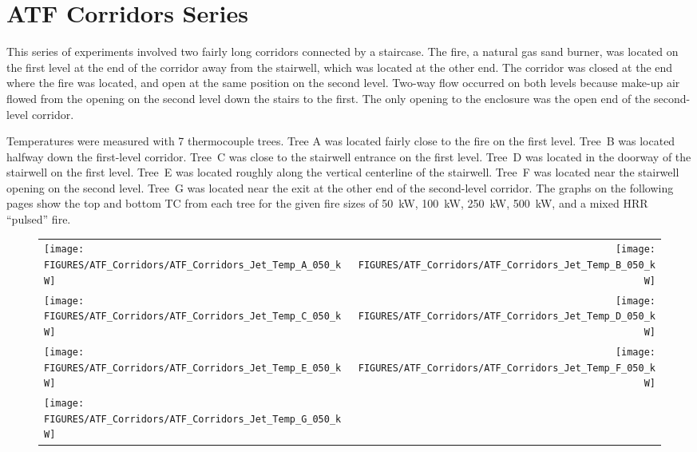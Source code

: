 \clearpage

\section{ATF Corridors Series}

This series of experiments involved two fairly long corridors connected by a staircase. The fire, a natural gas sand
burner, was located on the first level at the end of the corridor away from the stairwell, which was located at the
other end. The corridor was closed at the end where the fire was located, and open at the same position on the
second level. Two-way flow occurred on both levels because make-up air flowed from the opening on the second level down
the stairs to the first. The only opening to the enclosure was the open end of the second-level corridor.

Temperatures were measured with 7 thermocouple trees. Tree A was located fairly close to the fire on the first level. Tree~B
was located halfway down the first-level corridor. Tree~C was close to the stairwell entrance on the first level. Tree~D was located
in the doorway of the stairwell on the first level. Tree~E was located roughly along the vertical centerline of the
stairwell. Tree~F was located near the stairwell opening on the second level. Tree~G was located near the exit at the
other end of the second-level corridor. The graphs on the following pages show the top and bottom TC from each tree for
the given fire sizes of 50~kW, 100~kW, 250~kW, 500~kW, and a mixed HRR ``pulsed'' fire.

\begin{figure}[p]
\begin{tabular*}{\textwidth}{l@{\extracolsep{\fill}}r}
\texttt{[image: FIGURES/ATF\_Corridors/ATF\_Corridors\_Jet\_Temp\_A\_050\_kW]} &
\texttt{[image: FIGURES/ATF\_Corridors/ATF\_Corridors\_Jet\_Temp\_B\_050\_kW]} \\
\texttt{[image: FIGURES/ATF\_Corridors/ATF\_Corridors\_Jet\_Temp\_C\_050\_kW]} &
\texttt{[image: FIGURES/ATF\_Corridors/ATF\_Corridors\_Jet\_Temp\_D\_050\_kW]} \\
\texttt{[image: FIGURES/ATF\_Corridors/ATF\_Corridors\_Jet\_Temp\_E\_050\_kW]} &
\texttt{[image: FIGURES/ATF\_Corridors/ATF\_Corridors\_Jet\_Temp\_F\_050\_kW]} \\
\texttt{[image: FIGURES/ATF\_Corridors/ATF\_Corridors\_Jet\_Temp\_G\_050\_kW]} &
\end{tabular*}
\label{ATF_Corridors_Jet_Temp_50_kW}
\end{figure}


